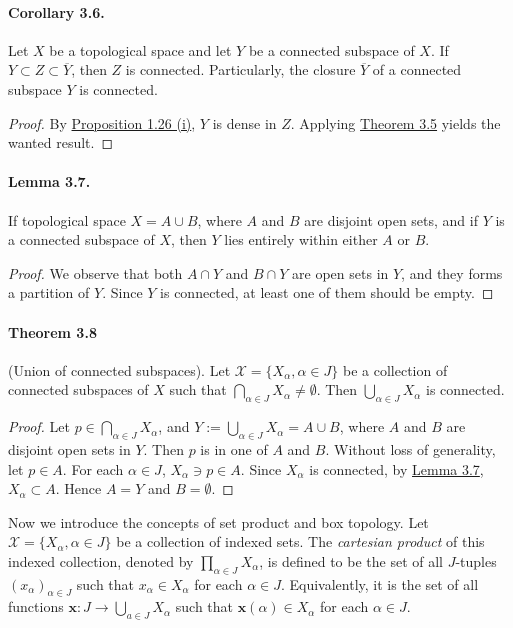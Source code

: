 \documentclass{article}
\numberwithin{equation}{section}
\theoremstyle{plain}
\theoremstyle{definition}
\begin{document}
\paragraph{Corollary 3.6.\label{cor:3.6}} Let $X$ be a topological space and let $Y$ be a connected subspace of $X$. If $Y\subset Z\subset\overline{Y}$, then $Z$ is connected. Particularly, the closure $\overline{Y}$ of a connected subspace $Y$ is connected.
\begin{proof}
By \hyperref[prop:1.26]{Proposition 1.26 (i)}, $Y$ is dense in $Z$. Applying \hyperref[thm:3.5]{Theorem 3.5} yields the wanted result.
\end{proof}

\paragraph{Lemma 3.7.\label{lemma:3.7}} If topological space $X=A\cup B$, where $A$ and $B$ are disjoint open sets, and if $Y$ is a connected subspace of $X$, then $Y$ lies entirely within either $A$ or $B$.
\begin{proof}
We observe that both $A\cap Y$ and $B\cap Y$ are open sets in $Y$, and they forms a partition of $Y$. Since $Y$ is connected, at least one of them should be empty.
\end{proof}

\paragraph{Theorem 3.8\label{thm:3.8}} (Union of connected subspaces). Let $\mathscr{X}=\{X_\alpha,\alpha\in J\}$ be a collection of connected subspaces of $X$ such that $\bigcap_{\alpha\in J}X_\alpha\neq\emptyset$. Then $\bigcup_{\alpha\in J} X_\alpha$ is connected.
\begin{proof}
Let $p\in\bigcap_{\alpha\in J}X_\alpha$, and $Y:=\bigcup_{\alpha\in J}X_\alpha = A\cup B$, where $A$ and $B$ are disjoint open sets in $Y$. Then $p$ is in one of $A$ and $B$. Without loss of generality, let $p\in A$. For each $\alpha\in J$, $X_\alpha\ni p\in A$. Since $X_\alpha$ is connected, by \hyperref[lemma:3.7]{Lemma 3.7}, $X_\alpha\subset A$. Hence $A=Y$ and $B=\emptyset$.
\end{proof}

Now we introduce the concepts of set product and box topology. Let $\mathscr{X}=\{X_\alpha,\alpha\in J\}$ be a collection of indexed sets. The \textit{cartesian product} of this indexed collection, denoted by $\prod_{\alpha\in J}X_\alpha$, is defined to be the set of all $J$-tuples $(x_\alpha)_{\alpha\in J}$ such that $x_\alpha\in X_\alpha$ for each $\alpha\in J$. Equivalently, it is the set of all functions $\mathbf{x}:J\to\bigcup_{a\in J}X_\alpha$ such that $\mathbf{x}(\alpha)\in X_\alpha$ for each $\alpha\in J$. 
\end{document}
